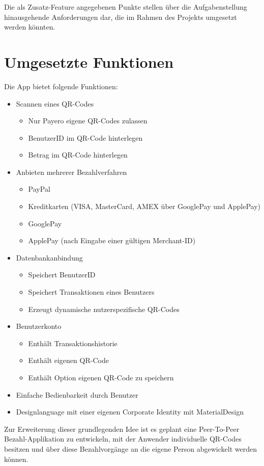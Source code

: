 Die als Zusatz-Feature angegebenen Punkte stellen über die Aufgabenstellung hinausgehende Anforderungen dar, die im Rahmen des Projekts umgesetzt werden könnten.


\section{Umgesetzte Funktionen}

Die App bietet folgende Funktionen:

\begin{itemize}
    \item Scannen eines QR-Codes
    \begin{itemize}
        \item Nur Payero eigene QR-Codes zulassen
        \item BenutzerID im QR-Code hinterlegen
        \item Betrag im QR-Code hinterlegen
    \end{itemize}
    \item Anbieten mehrerer Bezahlverfahren
    \begin{itemize}
        \item PayPal
        \item Kreditkarten (VISA, MasterCard, AMEX über GooglePay und ApplePay)
        \item GooglePay
        \item ApplePay (nach Eingabe einer gültigen Merchant-ID)
    \end{itemize}
    \item Datenbankanbindung
    \begin{itemize}
        \item Speichert BenutzerID
        \item Speichert Transaktionen eines Benutzers
        \item Erzeugt dynamische nutzerspezifische QR-Codes
    \end{itemize}
    \item Benutzerkonto
    \begin{itemize}
        \item Enthält Transaktionshistorie
        \item Enthält eigenen QR-Code
        \item Enthält Option eigenen QR-Code zu speichern
    \end{itemize}
    \item Einfache Bedienbarkeit durch Benutzer
    \item Designlanguage mit einer eigenen Corporate Identity mit MaterialDesign
\end{itemize}

Zur Erweiterung dieser grundlegenden Idee ist es geplant eine Peer-To-Peer Bezahl-Applikation zu entwickeln, mit der Anwender individuelle QR-Codes besitzen und über diese Bezahlvorgänge an die eigene Person abgewickelt werden können.